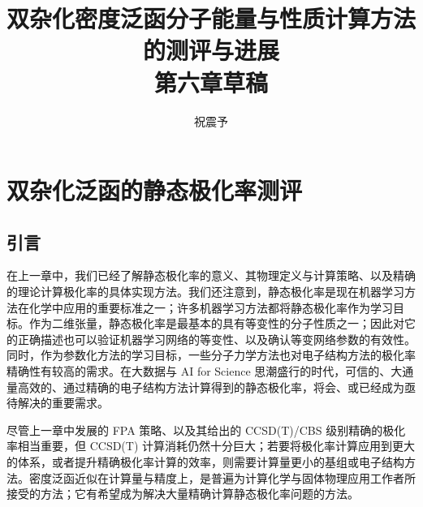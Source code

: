 



\title{\textbf{双杂化密度泛函分子能量与性质计算方法的测评与进展\\第六章草稿}}
\author{祝震予}
\maketitle
\vspace{-10pt}

\tableofcontents


\setcounter{section}{5}

\section{双杂化泛函的静态极化率测评}

\subsection{引言}

在上一章中，我们已经了解静态极化率的意义、其物理定义与计算策略、以及精确的理论计算极化率的具体实现方法。我们还注意到，静态极化率是现在机器学习方法在化学中应用的重要标准之一；许多机器学习方法都将静态极化率作为学习目标\cite{Ramakrishnan-Lilienfeld.SD.2014, Gilmer-Dahl.ICML.2017, Faber-Lilienfeld.JCTC.2017, Schuett-Mueller.NIPS.2017, Schuett-Mueller.JCP.2018, Wilkins-Ceriotti.PNAS.2019, Schuett-Gastegger.arXiv.2021, Zhang-Jiang.Elsevier.2023, Zou-Hu.NCS.2023}。作为二维张量，静态极化率是最基本的具有等变性的分子性质之一；因此对它的正确描述也可以验证机器学习网络的等变性、以及确认等变网络参数的有效性\cite{Cohen-Welling.arXiv.2016, Schuett-Gastegger.arXiv.2021, Brandstetter-Welling.arXiv.2022, Geiger-Smidt.arXiv.2022}。同时，作为参数化方法的学习目标，一些分子力学方法也对电子结构方法的极化率精确性有较高的需求\cite{Halgren-Damm.COSB.2001, Baker-Baker.WCMS.2015, Goloviznina-Padua.JCTC.2019, Schauperl-Gilson.CC.2020}。在大数据与 AI for Science 思潮盛行的时代，可信的、大通量高效的、通过精确的电子结构方法计算得到的静态极化率，将会、或已经成为亟待解决的重要需求。

尽管上一章中发展的 FPA 策略、以及其给出的 CCSD(T)/CBS 级别精确的极化率相当重要，但 CCSD(T) 计算消耗仍然十分巨大；若要将极化率计算应用到更大的体系，或者提升精确极化率计算的效率，则需要计算量更小的基组或电子结构方法。密度泛函近似在计算量与精度上，是普遍为计算化学与固体物理应用工作者所接受的方法；它有希望成为解决大量精确计算静态极化率问题的方法。

